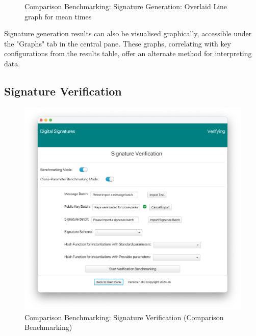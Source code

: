 \documentclass[]{final_report}
\begin{document}
\begin{figure}[H]
\begin{minipage}{0.7\textwidth}
        \centering
       \caption{Comparison Benchmarking: Signature Generation: Overlaid Line graph for mean times}
        \label{fig:image2}
    \end{minipage}
\end{figure}

Signature generation results can also be visualised graphically, accessible under the "Graphs" tab in the central pane. These graphs, correlating with key configurations from the results table, offer an alternate method for interpreting data.


\subsection{Signature Verification}

\begin{figure}[H]
    \centering
    \includegraphics[scale= 0.4]{main_pictures/ui/verifying/verifying0.png}
   \caption{Comparison Benchmarking: Signature Verification (Comparison Benchmarking)}
\end{figure}
\end{document}
